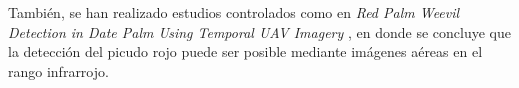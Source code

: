 

También, se han realizado estudios controlados como en \textit{Red Palm Weevil Detection in Date Palm Using Temporal UAV Imagery} \citep{delalieux_red_2023}, en donde se concluye que la detección del picudo rojo puede ser posible mediante imágenes aéreas en el rango infrarrojo.

